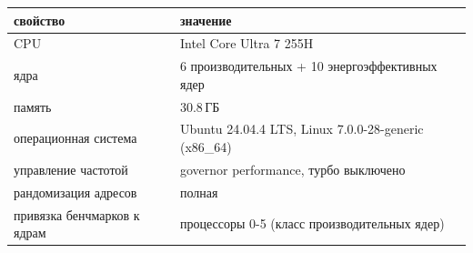 \begin{tabular}{ll}
\toprule
свойство & значение \\
\midrule
CPU & Intel Core Ultra 7 255H \\
ядра & 6 производительных + 10 энергоэффективных ядер \\
память & 30.8\,ГБ \\
операционная система & Ubuntu 24.04.4 LTS, Linux 7.0.0-28-generic (x86\_64) \\
управление частотой & governor performance, турбо выключено \\
рандомизация адресов & полная \\
привязка бенчмарков к ядрам & процессоры 0-5 (класс производительных ядер) \\
\bottomrule
\end{tabular}
